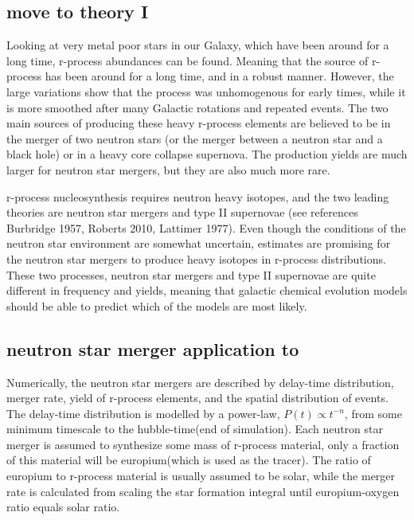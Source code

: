 \subsection{move to theory I}
Looking at very metal poor stars in our Galaxy, which have been around for a long time, r-process abundances can be found. Meaning that the source of r-process has been around for a long time, and in a robust manner. However, the large variations show that the process was unhomogenous for early times, while it is more smoothed after many Galactic rotations and repeated events.
The two main sources of producing these heavy r-process elements are believed to be in the merger of two neutron stars (or the merger between a neutron star and a black hole) or in a heavy core collapse supernova. The production yields are much larger for neutron star mergers, but they are also much more rare.

r-process nucleosynthesis requires neutron heavy isotopes, and the two leading theories are neutron star mergers and type II supernovae (see references Burbridge 1957, Roberts 2010, Lattimer 1977). Even though the conditions of the neutron star environment are somewhat uncertain, estimates are promising for the neutron star mergers to produce heavy isotopes in r-process distributions.
These two processes, neutron star mergers and type II supernovae are quite different in frequency and yields, meaning that galactic chemical evolution models should be able to predict which of the models are most likely.

\subsection{neutron star merger application to \eris}
Numerically, the neutron star mergers are described by delay-time distribution, merger rate, yield of r-process elements, and the spatial distribution of events.
The delay-time distribution is modelled by a power-law, $P(t) \propto t^{-n}$, from some minimum timescale to the hubble-time(end of simulation).
Each neutron star merger is assumed to synthesize some mass of r-process material, only a fraction of this material will be europium(which is used as the tracer).
The ratio of europium to r-process material is usually assumed to be solar, while the merger rate is calculated from scaling the star formation integral until europium-oxygen ratio equals solar ratio.


